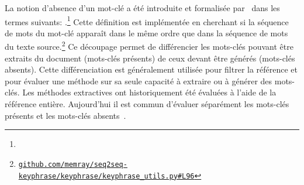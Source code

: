 La notion d'absence d'un mot-clé a été introduite et formalisée par~\citet{meng_deep_2017} dans les termes suivants:
.\footnote{}
Cette définition est implémentée en cherchant si la séquence de mots du mot-clé apparaît dans le même ordre que dans la séquence de mots du texte source.\footnote{\href{https://github.com/memray/seq2seq-keyphrase/blob/9145c63ebdc4c3bc431f8091dc52547a46804012/keyphrase/keyphrase\_utils.py\#L96}{\texttt{github.com/memray/seq2seq-keyphrase/keyphrase/keyphrase\_utils.py\#L96}}}
Ce découpage permet de différencier les mots-clés pouvant être extraits du document (mots-clés présents) de ceux devant être générés (mots-clés absents).
Cette différenciation est généralement utilisée pour filtrer la référence et pour évaluer une méthode sur sa seule capacité à extraire ou à générer des mots-clés.
Les méthodes extractives ont historiquement été évaluées à l'aide de la référence entière. Aujourd'hui il est commun d'évaluer séparément les mots-clés présents et les mots-clés absents~\cite{meng_deep_2017, sun_divgraphpointer_2019}.
%



